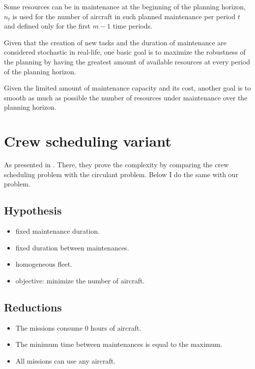 \documentclass[a4paper,11pt]{article}
\begin{document}
    Some resources can be in maintenance at the beginning of the planning horizon, $n_t$ is used for the number of aircraft in such planned maintenance per period $t$ and defined only for the first $m-1$ time periods.

    Given that the creation of new tasks and the duration of maintenance are considered stochastic in real-life, one basic goal is to maximize the robustness of the planning by having the greatest amount of available resources at every period of the planning horizon. 

    Given the limited amount of maintenance capacity and its cost, another goal is to smooth as much as possible the number of resources under maintenance over the planning horizon.


\clearpage
\section{Crew scheduling variant}

    As presented in \cite{Brunner2013}. There, they prove the complexity by comparing the crew scheduling problem with the circulant problem. Below I do the same with our problem.

    \subsection{Hypothesis}

    \begin{itemize}
     \item fixed maintenance duration.
     \item fixed duration between maintenances.
     \item homogeneous fleet.
     \item objective: minimize the number of aircraft.
    \end{itemize}

    \subsection{Reductions}

    \begin{itemize}
        \item The missions consume 0 hours of aircraft.
        \item The minimum time between maintenances is equal to the maximum.
        \item All missions can use any aircraft.
    \end{itemize}
\end{document}
